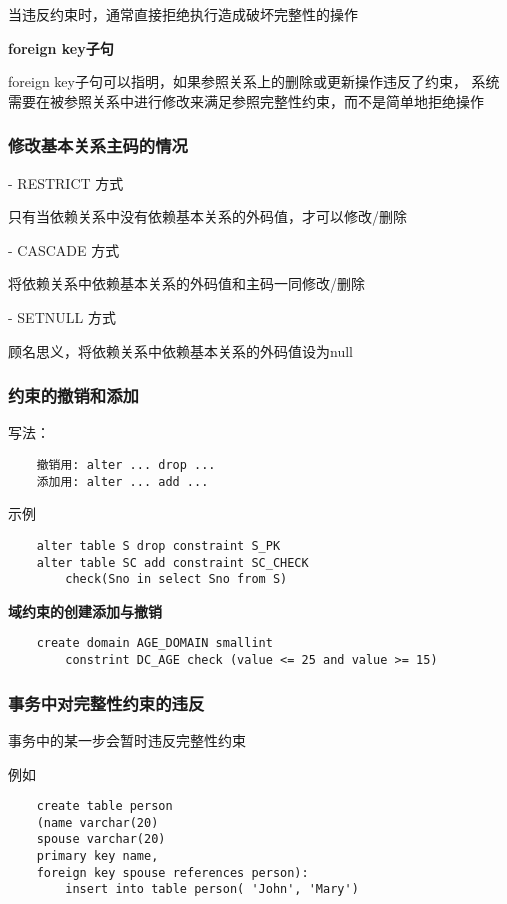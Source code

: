 \documentclass{article}        %
\begin{document}
当违反约束时，通常直接拒绝执行造成破坏完整性的操作

\textbf{foreign key子句}

foreign key子句可以指明，如果参照关系上的删除或更新操作违反了约束，
系统需要在被参照关系中进行修改来满足参照完整性约束，而不是简单地拒绝操作

\subsubsection{修改基本关系主码的情况}

- RESTRICT 方式

只有当依赖关系中没有依赖基本关系的外码值，才可以修改/删除

- CASCADE 方式 

将依赖关系中依赖基本关系的外码值和主码一同修改/删除

- SETNULL 方式 

顾名思义，将依赖关系中依赖基本关系的外码值设为null

\subsubsection{约束的撤销和添加}

写法：

\begin{verbatim}
    撤销用: alter ... drop ... 
    添加用: alter ... add ... 
\end{verbatim}

示例 

\begin{verbatim}
    alter table S drop constraint S_PK 
    alter table SC add constraint SC_CHECK 
        check(Sno in select Sno from S)
\end{verbatim}

\textbf{域约束的创建添加与撤销}

\begin{verbatim}
    create domain AGE_DOMAIN smallint 
        constrint DC_AGE check (value <= 25 and value >= 15)
\end{verbatim}

\subsubsection{事务中对完整性约束的违反}

事务中的某一步会暂时违反完整性约束

例如

\begin{verbatim}
    create table person 
    (name varchar(20)
    spouse varchar(20)
    primary key name, 
    foreign key spouse references person):
        insert into table person( 'John', 'Mary')
\end{verbatim}
\end{document}
